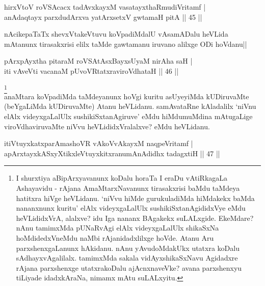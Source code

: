 
\begin{shl}
hirxVtoV roVSAcacx tadAvxkayxM vasatayxthaRmudiVritamf | \\
anAdaqtayx parxdudArxva yatArx\s \s setxV gwtamaH pitA \hfill|| 45 || 
\end{shl}

\begin{artha}
nAcikepaTaTx shevxVtakeVtuvu koVpadiMdalU vAsamADalu heVLida mAtanunx 
tirasakxrisi elilx taMde gawtamanu iruvano alilxge ODi hoVdanu||
\end{artha}

\begin{shl}
pArxpAyxtha pitaraM roVSAtAsxBayxsUyaM nirAha saH | \\
iti vAveVti vacanaM pUvoVRtatxraviroVdhataH \hfill|| 46 || 
\end{shl}

\begin{artha}
\footnote[1]{I shurxtiya aBipArxyavanunx koDalu horaTa I eraDu 
vAtiRkagaLa Ashayavidu - rAjana AmaMtarxNavanunx tirasakxrisi baMdu 
taMdeya hatitxra hiVge heVLidanu. `niVvu hiMde gurukuladiMda hiMdakekx 
baMda nananxnunx kuritu' elAlx videyxgaLalUlx sushikiSxtanAgididxVye 
eMdu heVLididxVrA, alalxve? idu Iga nananx BAgakekx suLALxgide. 
EkeMdare? nAnu tamimxMda pUNaRvAgi elAlx videyxgaLalUlx shikaSxNa 
hoMdidedxVneMdu naMbi rAjanidadxlilxge hoVde. Atanu Aru 
parxshenxgaLanunx hAkidanu. nAnu yAvudoMdakUkx utatxra koDalu 
sAdhayxvAgalilalx. tamimxMda sakala vidAyxshikaSxNavu Agidadxre rAjana 
parxshenxge utatxrakoDalu ajAcnxnaveVke? avana parxshenxyu tiLiyade 
idadxkAraNa, nimamx mAtu suLALxyitu.}\\
anaMtara koVpadiMda taMdeyanunx hoVgi kuritu asUyeyiMda kUDiruvaMte 
(beYgaLiMda kUDiruvaMte) Atanu heVLidanu. samAvataRne kAladalilx 
`niVnu elAlx videyxgaLalUlx sushikiSxtanAgiruve' eMdu hiMdumuMdina 
mAtugaLige viroVdhaviruvaMte niVvu heVLididxVralalxve? eMdu heVLidanu.
\end{artha}


\begin{shl}
itiVtuyxkatxparAmashoVR vAkoVvAkayxM naqpeVritamf | \\
apArxtayxkASxyXtikxleVtuyxkitxranumAnAdidhx tadagxtiH \hfill|| 47 || 
\end{shl}

